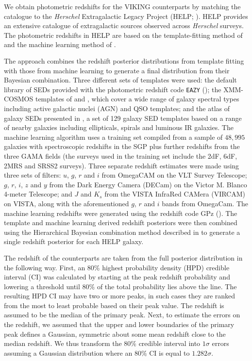 We obtain photometric redshifts for the VIKING counterparts by matching the catalogue to the \textit{Herschel} Extragalactic Legacy Project (HELP; \citealt{Vaccari_2016, Shirley_2019}). HELP provides an extensive catalogue of extragalactic sources observed across \textit{Herschel} surveys. The photometric redshifts in HELP are based on the template-fitting method of \citealt{Duncan_2018a} and the machine learning method of \citealt{Duncan_2018b}.

The approach combines the redshift posterior distributions from template fitting with those from machine learning to generate a final distribution from their Bayesian combination. Three different sets of templates were used: the default library of SEDs provided with the photometric redshift code \texttt{EAZY} (\citealt{Brammer_2008}); the XMM-COSMOS templates of \citealt{Salvato_2009} and \citealt{Salvato_2011}, which cover a wide range of galaxy spectral types including active galactic nuclei (AGN) and QSO templates; and the atlas of galaxy SEDs presented in \citealt{Brown_2014}, a set of 129 galaxy SED templates based on a range of nearby galaxies including ellipticals, spirals and luminous IR galaxies. The machine learning algorithm uses a training set compiled from a sample of $48,995$ galaxies with spectroscopic redshifts in the SGP plus further redshifts from the three GAMA fields (the surveys used in the training set include the 2dF, 6dF, 2MRS and SRSS2 surveys). Three separate redshift estimates were made using three sets of filters: $u$, $g$, $r$ and $i$ from OmegaCAM on the VLT Survey Telescope; $g$, $r$, $i$, $z$ and $y$ from the Dark Energy Camera (DECam) on the Victor M. Blanco 4-meter Telescope; and $J$ and $K_s$ from the VISTA InfraRed CAMera (VIRCAM) on VISTA, along with the aforementioned $g$, $r$ and $i$ bands from OmegaCam. The machine learning redshifts were generated using the redshift code GPz (\citealt{Almosallam_2016}). The template and machine learning derived redshift posteriors were then combined using the Hierarchical Bayesian combination method described in \citealt{Dahlen_2013} to generate a single redshift posterior for each HELP galaxy.

The redshift of the counterparts are taken from the full posterior distribution in the following way. First, an 80\% highest probability density (HPD) credible interval (CI) was calculated by starting at the peak redshift probability and lowering a threshold until 80\% of the total probability lies above the line. The resulting HPD CI may have two or more peaks, in such cases they are ranked from the most to least probable based on their peak value. The redshift is assumed to be the median of the primary peak. Next, to estimate the errors on the redshift, we assumed that the upper and lower boundaries of the primary peak defines a Gaussian, symmetric about some mean redshift close to the median redshift. We thus transform the $80\%$ credible interval into $1\sigma$ errors assuming a Gaussian distribution where an $80\%$ CI is equal to $1.282\sigma$.

